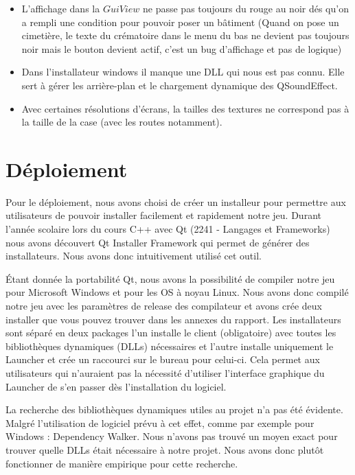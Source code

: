 \documentclass[a4paper,10pt,openany,oneside]{report}
\begin{document}
\begin{itemize}
\item L'affichage dans la $GuiView$ ne passe pas toujours du rouge au noir dés qu'on a rempli une condition pour pouvoir poser un bâtiment (Quand on pose un cimetière, le texte du crématoire dans le menu du bas ne devient pas toujours noir mais le bouton devient actif, c'est un bug d'affichage et pas de logique)
\item Dans l'installateur windows il manque une DLL qui nous est pas connu. Elle sert à gérer les arrière-plan et le chargement dynamique des QSoundEffect.
\item Avec certaines résolutions d'écrans, la tailles des textures ne correspond pas à la taille de la case (avec les routes notamment).
\end{itemize}


\section{Déploiement}
Pour le déploiement, nous avons choisi de créer un installeur pour permettre aux utilisateurs de pouvoir installer  facilement et rapidement notre jeu. Durant l'année scolaire lors du cours C++ avec Qt (2241 - Langages et Frameworks) nous avons découvert Qt Installer Framework qui permet de générer des installateurs. Nous avons donc intuitivement utilisé cet outil.
\newline

Étant donnée la portabilité Qt, nous avons la possibilité de compiler notre jeu pour Microsoft Windows et pour les OS à noyau Linux. Nous avons donc compilé notre jeu avec les paramètres de release des compilateur et avons crée deux installer que vous pouvez trouver dans les annexes du rapport.
Les installateurs sont séparé en deux packages l'un installe le client (obligatoire) avec toutes les bibliothèques dynamiques (DLLs) nécessaires et l'autre installe uniquement le Launcher et crée un raccourci sur le bureau pour celui-ci.
Cela permet aux utilisateurs qui n'auraient pas la nécessité d'utiliser l'interface graphique du Launcher de s'en passer dès l'installation du logiciel.
\newline

La recherche des bibliothèques dynamiques utiles au projet n'a pas été évidente. Malgré l'utilisation de logiciel prévu à cet effet, comme par exemple pour Windows : Dependency Walker. Nous n'avons pas trouvé un moyen exact pour trouver quelle DLLs était nécessaire à notre projet. Nous avons donc plutôt fonctionner de manière empirique pour cette recherche.
\newline
\end{document}
